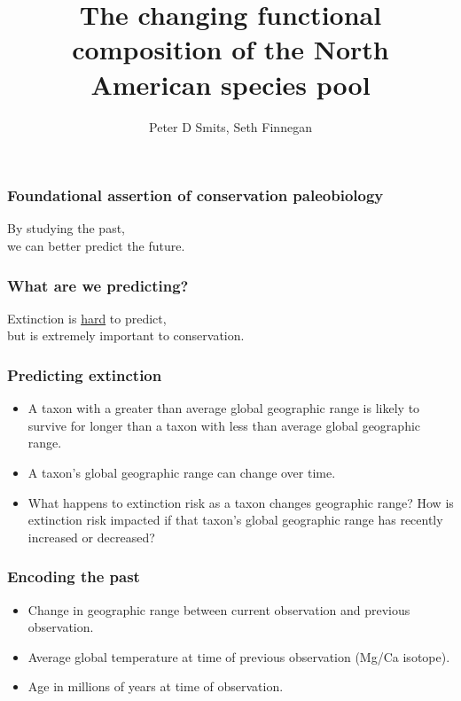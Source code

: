 \documentclass{beamer}
\title{The changing functional composition of the North American species pool}
\subtitle{ }
\author{Peter D Smits, Seth Finnegan}
\institute{Department of Integrative Biology, University of California -- Berkeley}
\date{}
\begin{document}
\begin{frame}
  \maketitle
\end{frame}


\begin{frame}
  \frametitle{Foundational assertion of conservation paleobiology }

  \begin{center}
    \begin{LARGE}
      By studying the \alert{past}, \\we can better predict the \alert{future}.
    \end{LARGE}
  \end{center}

\end{frame}


\begin{frame}
  \frametitle{What are we predicting?}
  
  \begin{center}
    \begin{LARGE}
      Extinction is \underline{hard} to predict, \\but is extremely important to conservation.
    \end{LARGE}
  \end{center}

\end{frame}


\begin{frame}
  \frametitle{Predicting extinction}

  \begin{itemize}[<+->]
    \item A taxon with a \alert{greater than average} global geographic range is likely to survive for longer than a taxon with \alert{less than average} global geographic range.
    \item A taxon's global geographic range can change over time.
    \item What happens to extinction risk as a taxon changes geographic range? How is extinction risk impacted if that taxon's global geographic range has recently \alert{increased} or \alert{decreased}?
  \end{itemize}

\end{frame}


\begin{frame}
  \frametitle{Encoding the past}

  \begin{itemize}
    \item Change in geographic range between current observation and previous observation.
    \item Average global temperature at time of previous observation (Mg/Ca isotope).
    \item Age in millions of years at time of observation.
  \end{itemize}

\end{frame}
\end{document}

